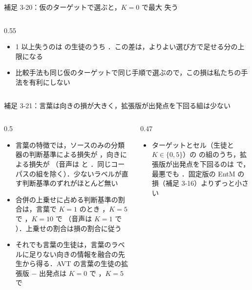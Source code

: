 \begin{frame}{補足 3-20：仮のターゲットで選ぶと，$K=0$ で最大  \pt 失う}
\begin{columns}[T,onlytextwidth]
\begin{column}{0.55\textwidth}
\begin{itemize}
        \item 1 \pt 以上失うのは  の生徒のうち ．この差は，よりよい選び方で足せる分の上限になる
        \item 比較手法も同じ仮のターゲットで同じ手順で選ぶので，この損は私たちの手法を有利にしない
      \end{itemize}
      \vspace{0.6em}
    \end{column}
  \end{columns}
\end{frame}

\begin{frame}{補足 3-21：言葉は向きの損が大きく，拡張版が出発点を下回る組は少ない}
  \label{s:c:disc}
  \vspace{0.1em}
  \begin{columns}[T,onlytextwidth]
    \begin{column}{0.5\textwidth}
      \begin{itemize}\scriptsize\setlength{\itemsep}{5pt}
        \item 言葉の特徴では，ソースのみの分類器の判断基準による損失が  \pt，向きによる損失が  \pt（音声は  と ．同じコーパスの組を除く）．少ないラベルが直す判断基準のずれがほとんど無い
        \item 合併の上乗せに占める判断基準の割合は，言葉で $K=1$ のとき ，$K=5$ で ，$K=10$ で （音声は $K=1$ で ）．上乗せの割合は損の割合に従う
        \item それでも言葉の生徒は，言葉のラベルに足りない向きの情報を融合の先生から得る．AVT の言葉の生徒の拡張版 − 出発点は $K=0$ で ，$K=5$ で  \pt
      \end{itemize}
    \end{column}
    \begin{column}{0.47\textwidth}
      \begin{itemize}\scriptsize
        \item ターゲットとセル（生徒と $K \in \{0, 5\}$）の  の組のうち，拡張版が出発点を下回るのは  で，最悪でも  \pt．固定版の EntM の損（補足 3-16）よりずっと小さい

\end{itemize}
\end{column}
\end{columns}
\end{frame}
